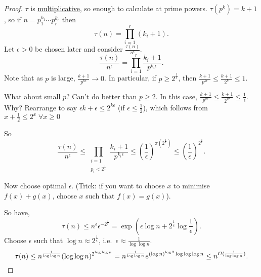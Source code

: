 \documentclass{article}
\newcommand{\bigO}{\mathcal{O}}
\begin{document}
\begin{proof}
  \hyperlink{def:tau}{$\tau$} is \hyperlink{def:multi}{multiplicative}, so enough to calculate at prime powers. $\tau(p^k) = k+1$, so if $n = p_1^{k_1} \dotsm p_r^{k_r}$ then
  \begin{equation*}
    \tau(n) = \prod_{i=1}^r (k_i + 1).
  \end{equation*}
  Let $\epsilon > 0$ be chosen later and consider $\frac{\tau(n)}{n^\epsilon}$.
  \begin{equation*}
    \frac{\tau(n)}{n^\epsilon} = \prod_{i=1}^r \frac{k_i+1}{p^{k_i \epsilon}}.
  \end{equation*}
  Note that as $p$ is large, $\frac{k+1}{p^{k\epsilon}} \to 0$. In particular, if $p \geq 2^{\frac{1}{\epsilon}}$, then $\frac{k+1}{p^{k\epsilon}} \leq \frac{k+1}{2^k} \leq 1$.

  What about small $p$? Can't do better than $p \geq 2$.
  In this case, $\frac{k+1}{p^{k\epsilon}} \leq \frac{k+1}{2^{k\epsilon}} \leq \frac{1}{\epsilon}$.
  Why? Rearrange to say $\epsilon k + \epsilon \leq 2^{k \epsilon}$ (if $\epsilon \leq \frac{1}{2}$), which follows from $x + \frac{1}{2} \leq 2^x \; \forall x \geq 0$

  So
  \begin{equation*}
    \frac{\tau(n)}{n^\epsilon} \leq \prod_{\substack{i=1 \\ p_i < 2^{\frac{1}{\epsilon}}}} \frac{k_i + 1}{p^{k_i \epsilon}} \leq \left(\frac{1}{\epsilon}\right)^{\pi(2^{\frac{1}{\epsilon}})} \leq \left(\frac{1}{\epsilon}\right)^{2^{\frac{1}{\epsilon}}}.
  \end{equation*}

  Now choose optimal $\epsilon$.
  (Trick: if you want to choose $x$ to minimise $f(x) + g(x)$, choose $x$ such that $f(x) = g(x)$).

  So have,
  \begin{equation*}
    \tau(n) \leq n^\epsilon \epsilon^{-2^{\frac{1}{\epsilon}}} = \exp\left(\epsilon \log n + 2^{\frac{1}{\epsilon}} \log \frac{1}{\epsilon}\right).
  \end{equation*}
  Choose $\epsilon$ such that $\log n \approx 2^{\frac{1}{\epsilon}}$, i.e.\ $\epsilon \approx \frac{1}{\log \log n}$.
  \begin{equation*}
    \tau(n) \leq n^{\frac{1}{\log \log n}} (\log \log n)^{2^{\log \log n}} = n^{\frac{1}{\log \log n}} e^{(\log n)^{\log 2} \log \log \log n} \leq n^{\bigO(\frac{1}{\log \log n})}. \qedhere
  \end{equation*}
\end{proof}
\end{document}

